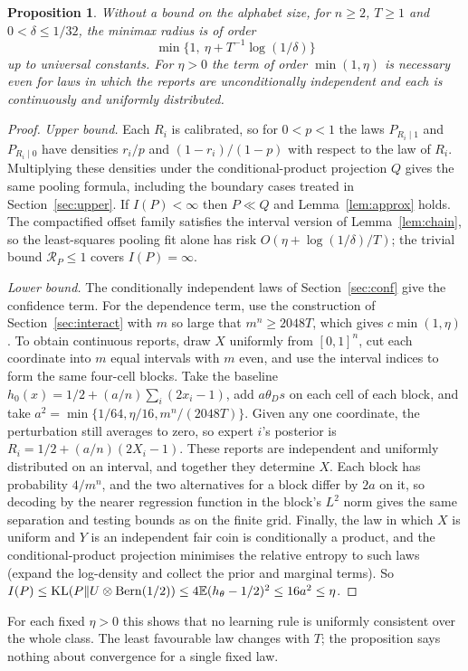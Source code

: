 \documentclass[11pt,a4paper]{article}
\newtheorem{proposition}[theorem]{Proposition}
\theoremstyle{remark}
\newcommand{\KL}{\mathop{\rm KL}\nolimits}
\newcommand{\E}{\mathbb E}
\newcommand{\cR}{\mathcal R}
\begin{document}
\begin{proposition}\label{prop:cont}
Without a bound on the alphabet size, for $n\ge2$, $T\ge1$ and $0<\delta\le1/32$, the minimax radius is of order
\[
 \min\{1,\ \eta+T^{-1}\log(1/\delta)\}
\]
up to universal constants. For $\eta>0$ the term of order $\min(1,\eta)$ is necessary even for laws in which the reports are unconditionally independent and each is continuously and uniformly distributed.
\end{proposition}
\begin{proof}
\emph{Upper bound.} Each $R_i$ is calibrated, so for $0<p<1$ the laws $P_{R_i\mid 1}$ and $P_{R_i\mid 0}$ have densities $r_i/p$ and $(1-r_i)/(1-p)$ with respect to the law of $R_i$. Multiplying these densities under the conditional-product projection $Q$ gives the same pooling formula, including the boundary cases treated in Section~\ref{sec:upper}. If $I(P)<\infty$ then $P\ll Q$ and Lemma~\ref{lem:approx} holds. The compactified offset family satisfies the interval version of Lemma~\ref{lem:chain}, so the least-squares pooling fit alone has risk $O(\eta+\log(1/\delta)/T)$; the trivial bound $\cR_P\le1$ covers $I(P)=\infty$.

\emph{Lower bound.} The conditionally independent laws of Section~\ref{sec:conf} give the confidence term. For the dependence term, use the construction of Section~\ref{sec:interact} with $m$ so large that $m^n\ge2048T$, which gives $c\min(1,\eta)$. To obtain continuous reports, draw $X$ uniformly from $[0,1]^n$, cut each coordinate into $m$ equal intervals with $m$ even, and use the interval indices to form the same four-cell blocks. Take the baseline $h_0(x)=1/2+(a/n)\sum_i(2x_i-1)$, add $a\theta_Ds$ on each cell of each block, and take $a^2=\min\{1/64,\eta/16,m^n/(2048T)\}$. Given any one coordinate, the perturbation still averages to zero, so expert $i$'s posterior is $R_i=1/2+(a/n)(2X_i-1)$. These reports are independent and uniformly distributed on an interval, and together they determine $X$. Each block has probability $4/m^n$, and the two alternatives for a block differ by $2a$ on it, so decoding by the nearer regression function in the block's $L^2$ norm gives the same separation and testing bounds as on the finite grid. Finally, the law in which $X$ is uniform and $Y$ is an independent fair coin is conditionally a product, and the conditional-product projection minimises the relative entropy to such laws (expand the log-density and collect the prior and marginal terms). So $I(P)\le\KL(P\|U\otimes\mathrm{Bern}(1/2))\le4\E(h_\theta-1/2)^2\le16a^2\le\eta$.
\end{proof}
For each fixed $\eta>0$ this shows that no learning rule is uniformly consistent over the whole class. The least favourable law changes with $T$; the proposition says nothing about convergence for a single fixed law.
\end{document}
